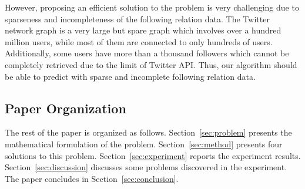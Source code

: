 
However, proposing an efficient solution to the problem is very challenging due to sparseness and incompleteness of the following relation data. The Twitter network graph is a very large but spare graph which involves over a hundred million users, while most of them are connected to only hundreds of users. Additionally, some users have more than a thousand followers which cannot be completely retrieved due to the limit of Twitter API. Thus, our algorithm should be able to predict with sparse and incomplete following relation data.

\subsection{Paper Organization}

The rest of the paper is organized as follows.
Section~\ref{sec:problem} presents the mathematical formulation of the problem. Section~\ref{sec:method} presents four solutions to this problem. Section~\ref{sec:experiment} reports the experiment results. Section~\ref{sec:discussion} discusses some problems discovered in the experiment. The paper concludes in Section~\ref{sec:conclusion}.

